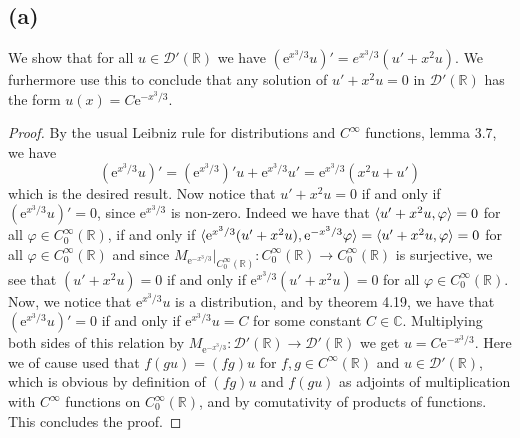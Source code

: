 \documentclass[a4paper,11pt]{article}
\newcommand{\euler}[1]{\text{e}^{#1}}
\newcommand{\R}{\mathbb{R}}
\newcommand{\C}{\mathbb{C}}
\numberwithin{equation}{section}
\begin{document}
\subsection*{(a)}
We show that for all $ u\in\mathcal{D}'(\R) $ we have $ (\euler{x^3/3}u)'=e^{x^3/3}(u'+x^2u) $. We furhermore use this to conclude that any solution of $ u'+x^2u=0 $ in $ \mathcal{D}'(\R) $ has the form $ u(x)=C\euler{-x^3/3} $.
\begin{proof}
	By the usual Leibniz rule for distributions and $ C^\infty $ functions, lemma 3.7, we have \begin{equation}
	(\euler{x^3/3}u)'=(\euler{x^3/3})'u+\euler{x^3/3}u'=\euler{x^3/3}(x^2 u+u')
	\end{equation}
	which is the desired result. Now notice that $ u'+x^2u=0 $ if and only if $ (\euler{x^3/3}u)'=0 $, since $ \euler{x^3/3} $ is non-zero. Indeed we have that $ \braket{u'+x^2u,\varphi}=0 $ for all $ \varphi\in C_0^\infty(\R) $, if and only if $ \braket{\euler{x^3/3}(u'+x^2u),\euler{-x^3/3}\varphi}=\braket{u'+x^2u,\varphi}=0 $ for all $ \varphi\in C_0^\infty(\R) $ and since $ M_{\euler{-x^3/3}}\rvert_{C_0^\infty(\R)}: C_0^\infty(\R)\to C_0^\infty(\R) $ is surjective, we see that $ (u'+x^2u)= 0 $ if and only if $ \euler{x^3/3}(u'+x^2u)= 0 $ for all $ \varphi\in C_0^\infty(\R) $. Now, we notice that $ \euler{x^3/3}u $ is a distribution, and by theorem 4.19, we have that $ (\euler{x^3/3}u )'=0 $ if and only if $ \euler{x^3/3}u =C $ for some constant $ C\in\C $. Multiplying both sides of this relation by $ M_{\euler{-x^3/3}}:\mathcal{D}'(\R)\to\mathcal{D}'(\R) $ we get $ u=C\euler{-x^3/3} $. Here we of cause used that $ f(gu)=(fg)u $ for $ f,g\in C^\infty(\R) $ and $ u\in\mathcal{D}'(\R) $, which is obvious by definition of $ (fg)u $ and $ f(gu) $ as adjoints of multiplication with $ C^\infty $ functions on $ C^\infty_0(\R) $, and by comutativity of products of functions. This concludes the proof.
\end{proof}
\end{document}
